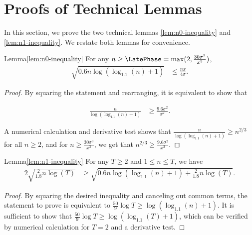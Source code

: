 \section{Proofs of Technical Lemmas}
\label{sec:n0-inequality-proof}
\label{sec:n1-inquality-proof}

In this section, we prove the two technical lemmas
\ref{lem:n0-inequality} and \ref{lem:n1-inequality}.
We restate both lemmas for convenience.

\begin{rtheorem}{Lemma}{\ref{lem:n0-inequality}}
For any $n \geq \LatePhase = \max (2, \frac{30 \sigma^3}{x^3})$, 
\begin{align*}
\sqrt{0.6 n \log (\log_{1.1}(n) + 1)} & \leq \frac{n x}{4 \sigma}. 
\end{align*}
\label{lem:n0-inequality-proof}
\end{rtheorem}

\begin{proof}
By squaring the statement and rearranging, it is equivalent to show that

\begin{align*}
\frac{n}{\log(\log_{1.1}(n)+1)}
  & \geq \frac{9.6\sigma^2}{x^2}.
\end{align*}

A numerical calculation and derivative test shows that
$\frac{n}{\log(\log_{1.1}(n)+1)} \geq n^{2/3}$ for all $n \geq 2$,
and for $n \geq \frac{30 \sigma^3}{x^3}$, we get that
$n^{2/3} \geq \frac{9.6 \sigma^2}{x^2}$.
\end{proof}


\begin{rtheorem}{Lemma}{\ref{lem:n1-inequality}}
For any $T \geq 2$ and $1 \leq n \leq T$, we have
\begin{align*}
2\sqrt{\frac{2}{1.8} n \log(T)}
& \geq \sqrt{0.6 n \log(\log_{1.1}(n)+1) + \frac{2}{1.8} n \log(T)}.
\end{align*}
\label{lem:n1-inequality-proof}
\end{rtheorem}

\begin{proof}
By squaring the desired inequality and canceling out common terms, the
statement to prove is equivalent to
$\frac{50}{9} \log T \geq \log(\log_{1.1}(n) + 1)$.
It is sufficient to show that
$\frac{50}{9} \log T \geq \log(\log_{1.1}(T) + 1)$,
which can be verified by numerical calculation for $T=2$ and a
derivative test.
\end{proof}
